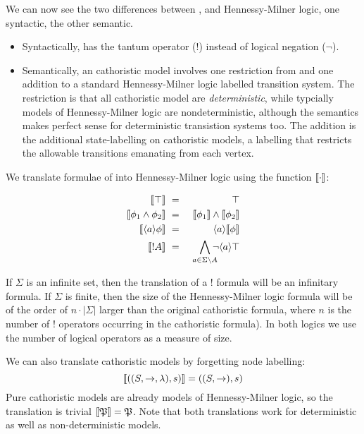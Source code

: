 \NI We can now see the two differences between \cathoristic{}, and
Hennessy-Milner logic, one syntactic, the other semantic.

\begin{itemize}

\item Syntactically, \cathoristic{} has the tantum operator ($!$) instead of
  logical negation ($\neg$).

\item Semantically, an cathoristic model involves one restriction from
  and one addition to a standard Hennessy-Milner logic labelled transition system. The
  restriction is that all cathoristic model are \emph{deterministic},
  while typcially models of Hennessy-Milner logic are
  nondeterministic, although the semantics makes perfect sense for
  deterministic transistion systems too. The addition is the
  additional state-labelling on cathoristic models, a labelling that
  restricts the allowable transitions emanating from each vertex.

\end{itemize}

\NI We translate formulae of \cathoristic{} into Hennessy-Milner logic using the function
$\lbrack\!\lbrack \cdot \rbrack\!\rbrack$:

\begin{eqnarray*}
  \SEMB{\top} & \ = \ & \top  \\
  \SEMB{\phi_1 \AND \phi_2} & \ = \ & \SEMB{\phi_1} \AND \SEMB{\phi_2}  \\
  \SEMB{\langle a \rangle \phi} & \ = \ & \langle a \rangle \SEMB{\phi}  \\
  \SEMB{! A} & \ = \ & \bigwedge_{a \in \Sigma \setminus A}\!\!\!\! \neg \langle a \rangle \top 
\end{eqnarray*}

\NI If $\Sigma$ is an infinite set, then the translation of a $!$
formula will be an infinitary formula.  If $\Sigma$ is finite, then
the size of the Hennessy-Milner logic formula will be of the order of $n \cdot | \Sigma |$
larger than the original cathoristic formula, where $n$ is the number of
$!$ operators occurring in the cathoristic formula). In both logics we
use the number of logical operators as a measure of size.

We can also translate cathoristic models by forgetting node labelling:
\[
   \lbrack\!\lbrack ((S, \rightarrow, \lambda), s) \rbrack\!\rbrack 
      =
   ((S, \rightarrow), s)
\]
Pure cathoristic models are already models of Hennessy-Milner logic, so the
translation is trivial $\lbrack\!\lbrack \frak{P} \rbrack\!\rbrack = \frak{P}$. Note that both
translations work for deterministic as well as non-deterministic
models.

